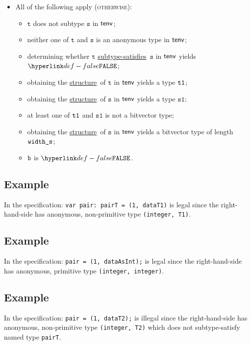 \documentclass{book}
\newcommand\ProseOrTypeError[0]{\ProseTerminateAs{\TypeErrorConfig}}
\newcommand\structure[0]{\hyperlink{def-structure}{structure}}
\newcommand\subtypesatisfies[0]{\hyperlink{def-subtypesatisfies}{subtype-satisfies}}
\newcommand\vt[0]{\texttt{t}}
\newcommand\vs[0]{\texttt{s}}
\newcommand\vsone[0]{\texttt{s1}}
\begin{document}
\begin{itemize}
  \item All of the following apply (\textsc{otherwise}):
  \begin{itemize}
    \item $\vt$ does not subtype $\vs$ in $\textsf{tenv}$;
    \item neither one of $\vt$ and $\vs$ is an anonymous type in $\textsf{tenv}$;
    \item determining whether $\vt$ \subtypesatisfies\ $\vs$ in $\textsf{tenv}$ yields $\False$;
    \item obtaining the \structure\ of $\vt$ in $\textsf{tenv}$ yields a type $\texttt{t1}$;
    \item obtaining the \structure\ of $\vs$ in $\textsf{tenv}$ yields a type $\vsone$;
    \item at least one of $\texttt{t1}$ and $\vsone$ is not a bitvector type;
    \item obtaining the \structure\ of $\vs$ in $\textsf{tenv}$ yields a bitvector type of length \\
          $\texttt{width\_s}$\ProseOrTypeError;
    \item $\texttt{b}$ is $\False$.
  \end{itemize}
\end{itemize}

\subsection{Example}
In the specification:
\texttt{var pair: pairT = (1, dataT1)} is legal since the right-hand-side has
anonymous, non-primitive type \texttt{(integer, T1)}.

\subsection{Example}
In the specification:
\texttt{pair = (1, dataAsInt);} is legal since the right-hand-side has anonymous,
primitive type \texttt{(integer, integer)}.

\subsection{Example}
In the specification:
\texttt{pair = (1, dataT2);} is illegal since the right-hand-side has anonymous,
non-primitive type \texttt{(integer, T2)} which does not subtype-satisfy named
type \texttt{pairT}.
\end{document}
